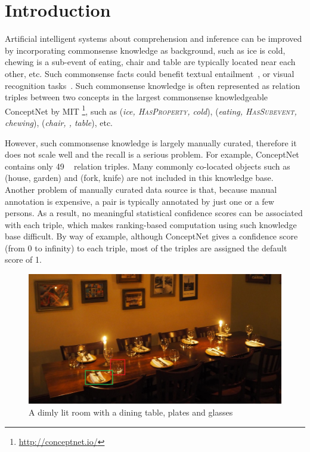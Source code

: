 \section{Introduction}
Artificial intelligent systems about comprehension and inference 
can be improved by incorporating commonsense knowledge as background, 
such as ice is cold, 
chewing is a sub-event of eating, 
chair and table are typically located near each other, etc. 
Such commonsense facts could benefit textual entailment~\cite{dagan2009recognizing,bowman2015large}, or visual recognition tasks~\cite{zhu2014reasoning}.
Such commonsense knowledge is often represented as relation triples
between two concepts in the largest commonsense knowledgeable ConceptNet by MIT \cite{speer2012representing}  \footnote{\url{http://conceptnet.io/}}, 
such as (\textit{ice, \textsc{HasProperty}, cold}), 
(\textit{eating, \textsc{HasSubevent}, chewing}), 
(\textit{chair, \lnear, table}), etc. 

However, such commonsense knowledge is largely manually curated, therefore it does not scale well and the recall is a serious problem.
For example, ConceptNet contains only 49 \lnear~
relation triples. 
Many commonly co-located objects such as (house, garden) and 
(fork, knife) are not included in this knowledge base. 
Another problem of manually curated data source is that, because manual
annotation is expensive, a pair is typically annotated by just one 
or a few persons. 
As a result, no meaningful statistical confidence scores can be
associated with each triple, which makes ranking-based 
computation using such knowledge base difficult. 
By way of example, although ConceptNet gives a confidence
score (from 0 to infinity) to each triple, most of the triples are assigned the default
score of 1.

\begin{figure}[th]
\center
\includegraphics[width=0.8\columnwidth]{dim-table.jpg}
\caption{A dimly lit room with a dining table, plates and glasses}
\label{fig:dim}
\end{figure}

